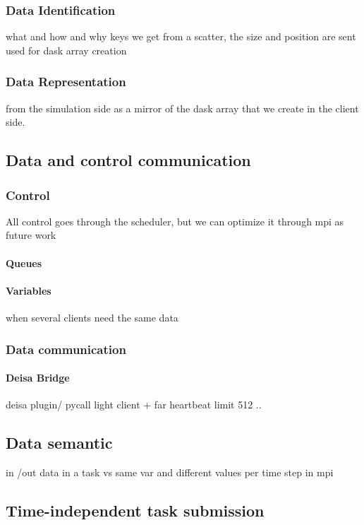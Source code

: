 \subsubsection{Data Identification}\label{sec:datamodel:dataid}
what and how and why 
keys we get from a scatter, the size and position are sent 
used for dask array creation 
\subsubsection{Data Representation}\label{sec:datamodel:datarepresent}
from the simulation side as a mirror of the dask array that we create in the client side.

\subsection{Data and control communication}
\subsubsection{Control}
All control goes through the scheduler, but we can optimize it through mpi as future work 
\paragraph{Queues} 

\paragraph{Variables}
when several clients need the same data 

\subsubsection{Data communication}
\paragraph{Deisa Bridge}
deisa plugin/ pycall
light client + far heartbeat 
limit 512 ..

\subsection{Data semantic}
in /out  data in a task vs same var and different values per time step in mpi

\subsection{Time-independent task submission}

